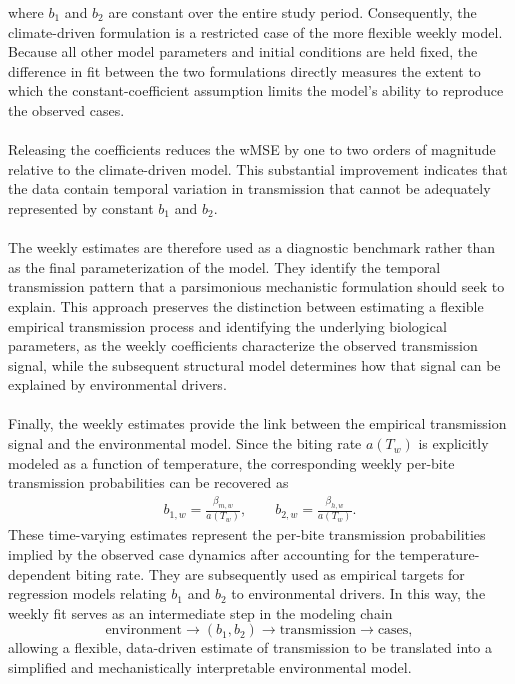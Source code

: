 \documentclass[a4paper,fleqn]{cas-dc}
\begin{document}
where $b_1$ and $b_2$ are constant over the entire study period. Consequently, the climate-driven formulation is a restricted case of the more flexible weekly model. Because all other model parameters and initial conditions are held fixed, the difference in fit between the two formulations directly measures the extent to which the constant-coefficient assumption limits the model's ability to reproduce the observed cases.
\\\\
Releasing the coefficients reduces the wMSE by one to two orders of magnitude relative to the climate-driven model. This substantial improvement indicates that the data contain temporal variation in transmission that cannot be adequately represented by constant 
$b_1$ and $b_2$.
\\\\
The weekly estimates are therefore used as a diagnostic benchmark rather than as the final parameterization of the model. They identify the temporal transmission pattern that a parsimonious mechanistic formulation should seek to explain. This approach preserves the distinction between estimating a flexible empirical transmission process and identifying the underlying biological parameters, as the weekly coefficients characterize the observed transmission signal, while the subsequent structural model determines how that signal can be explained by environmental drivers.
\\\\
Finally, the weekly estimates provide the link between the empirical transmission signal and the environmental model. Since the biting rate $a(T_w)$ is explicitly modeled as a function of temperature, the corresponding weekly per-bite transmission probabilities can be recovered as
\begin{align}
b_{1,w}=\frac{\beta_{m,w}}{a(T_w)},
\qquad
b_{2,w}=\frac{\beta_{h,w}}{a(T_w)}.
\label{eq}
\end{align}
These time-varying estimates represent the per-bite transmission probabilities implied by the observed case dynamics after accounting for the temperature-dependent biting rate. They are subsequently used as empirical targets for regression models relating $b_1$ and $b_2$ to environmental drivers. In this way, the weekly fit serves as an intermediate step in the modeling chain 
$$ \text{environment} \longrightarrow (b_1,b_2) \longrightarrow \text{transmission} \longrightarrow \text{cases}, $$
allowing a flexible, data-driven estimate of transmission to be translated into a simplified and mechanistically interpretable environmental model.
\end{document}
